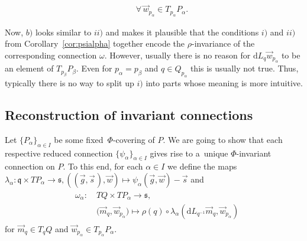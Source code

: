\documentclass[11pt]{article}
\numberwithin{equation}{section}
\begin{document}
\begin{Remark}
\begin{enumerate}
\begin{enumerate}
\begin{gather*}
\qquad\forall\, \vec{w}_{p_\alpha}\in T_{p_\alpha}P_\alpha.
\end{gather*}
\end{enumerate}
Now, $b)$ looks similar to $ii)$ and makes it plausible that the conditions
$i)$ and $ii)$ from Corollary~\ref{cor:psialpha} together encode the $\rho$-invariance of the corresponding
connection $\omega$.
However, usually there is no reason for $\mathrm{d} L_q \vec{w}_{p_\alpha}$ to be an element of $T_{p_\beta}P_\beta$.
Even for $p_\alpha=p_\beta$ and $q\in Q_{p_\alpha}$ this is usually not true.
Thus, typically there is no way to split up $i)$ into parts whose meaning is more intuitive.
\end{enumerate}
\end{Remark}
\setcounter{section}{4}
\setcounter{subsection}{1}
\setcounter{subsubsection}{0}
\setcounter{Theorem}{6}
\setcounter{equation}{3}
\subsection{Reconstruction of invariant connections}\label{subsec:Reconstruc}

Let $\{P_\alpha\}_{\alpha\in I}$ be some fixed~$\Phi$-covering of $P$.
We are going to show that each respective reduced connection $\{\psi_\alpha\}_{\alpha\in I}$ gives rise to a~unique
$\Phi$-invariant connection on $P$.
To this end, for each $\alpha\in I$ we def\/ine the maps $\lambda_\alpha\colon \mathfrak{q}\times TP_\alpha\rightarrow
\mathfrak{s}, ((\vec{g},\vec{s}\hspace{1pt}),\vec{w})\mapsto\psi_\alpha(\vec{g},\vec{w})-\vec{s}$ and
\begin{gather*}
\begin{split}
&\omega_\alpha\colon\quad TQ\times TP_\alpha  \rightarrow  \mathfrak{s},
\\
&\phantom{\omega_\alpha\colon\quad {}}
\big(\vec{m}_q,\vec{w}_{p_\alpha}\big) \mapsto  \rho(q)\circ \lambda_\alpha\left(\mathrm{d}
L_{q^{-1}}\vec{m}_q,\vec{w}_{p_\alpha}\right)
\end{split}
\end{gather*}
for $\vec{m}_q\in T_qQ$ and $\vec{w}_{p_\alpha}\in T_{p_\alpha}P_\alpha$.
\end{document}
